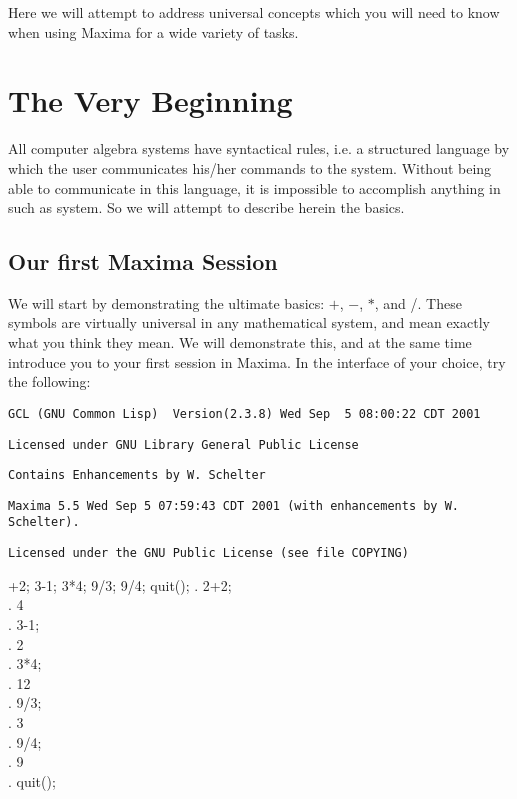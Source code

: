 
Here we will attempt to address universal concepts which you will 
need to know when using Maxima for a wide variety of tasks. 


\section{The Very Beginning}

All computer algebra systems have syntactical rules, i.e. a structured
language by which the user communicates his/her commands to the system.
Without being able to communicate in this language, it is impossible
to accomplish anything in such as system. So we will attempt to describe
herein the basics.


\subsection{Our first Maxima Session}

We will start by demonstrating the ultimate basics: \( + \), \( - \),
\( * \), and /. These symbols are virtually universal in any mathematical
system, and mean exactly what you think they mean. We will demonstrate
this, and at the same time introduce you to your first session in
Maxima. In the interface of your choice, try the following:

\vspace{3ex}

\texttt{\label{Example1}GCL (GNU Common Lisp)~ Version(2.3.8) Wed
Sep~ 5 08:00:22 CDT 2001}

\texttt{Licensed under GNU Library General Public License}

\texttt{Contains Enhancements by W. Schelter}

\texttt{Maxima 5.5 Wed Sep 5 07:59:43 CDT 2001 (with enhancements
by W. Schelter).}

\texttt{Licensed under the GNU Public License (see file COPYING)}

+2;
3-1;
3*4;
9/3;
9/4;
quit();
\maximatexsession
{}.  2+2; \\
.   4 \\
.  3-1; \\
.   2 \\
.  3*4; \\
.   12 \\
.  9/3; \\
.   3 \\
.  9/4; \\
.   {{9}} \\
.  quit(); \\
\endmaximasession


